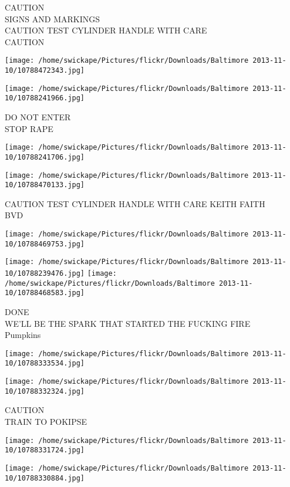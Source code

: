 \documentclass[10pt,letterpaper]{article}
\begin{document}
CAUTION\\
SIGNS AND MARKINGS\\
CAUTION TEST CYLINDER HANDLE WITH CARE\\
CAUTION
\pagebreak

\texttt{[image: /home/swickape/Pictures/flickr/Downloads/Baltimore 2013-11-10/10788472343.jpg]}

\vspace{0.25in}
\texttt{[image: /home/swickape/Pictures/flickr/Downloads/Baltimore 2013-11-10/10788241966.jpg]}

DO NOT ENTER\\
STOP RAPE
\pagebreak

\texttt{[image: /home/swickape/Pictures/flickr/Downloads/Baltimore 2013-11-10/10788241706.jpg]}

\vspace{0.25in}
\texttt{[image: /home/swickape/Pictures/flickr/Downloads/Baltimore 2013-11-10/10788470133.jpg]}

CAUTION TEST CYLINDER HANDLE WITH CARE KEITH FAITH\\
BVD
\pagebreak

\texttt{[image: /home/swickape/Pictures/flickr/Downloads/Baltimore 2013-11-10/10788469753.jpg]}

\vspace{0.25in}
\texttt{[image: /home/swickape/Pictures/flickr/Downloads/Baltimore 2013-11-10/10788239476.jpg]}
\texttt{[image: /home/swickape/Pictures/flickr/Downloads/Baltimore 2013-11-10/10788468583.jpg]}

DONE\\
WE'LL BE THE SPARK THAT STARTED THE FUCKING FIRE\\
Pumpkins
\pagebreak

\texttt{[image: /home/swickape/Pictures/flickr/Downloads/Baltimore 2013-11-10/10788333534.jpg]}

\vspace{0.25in}
\texttt{[image: /home/swickape/Pictures/flickr/Downloads/Baltimore 2013-11-10/10788332324.jpg]}

CAUTION\\
TRAIN TO POKIPSE
\pagebreak

\texttt{[image: /home/swickape/Pictures/flickr/Downloads/Baltimore 2013-11-10/10788331724.jpg]}

\vspace{0.25in}
\texttt{[image: /home/swickape/Pictures/flickr/Downloads/Baltimore 2013-11-10/10788330884.jpg]}
\end{document}
